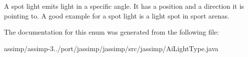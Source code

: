 A spot light emits light in a specific angle. It has a position and a direction it is pointing to. A good example for a spot light is a light spot in sport arenas. 

The documentation for this enum was generated from the following file\+:\begin{DoxyCompactItemize}
\item 
assimp/assimp-\/3../port/jassimp/jassimp/src/jassimp/Ai\+Light\+Type.\+java\end{DoxyCompactItemize}
